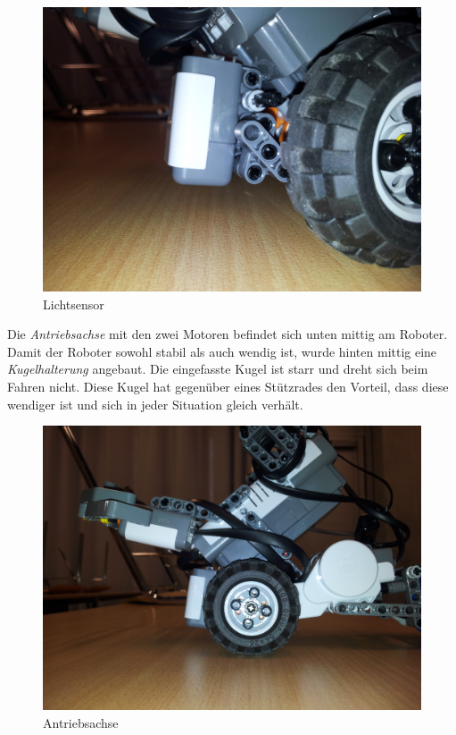 \documentclass[a4paper]{article}
\begin{document}
\begin{figure}[h]
  \centering
  \caption{Lichtsensor}
  \includegraphics[scale=0.06]{roboter_lichtsensor.jpg}
\end{figure}

Die \emph{Antriebsachse} mit den zwei Motoren befindet sich unten
mittig am Roboter. Damit der Roboter sowohl stabil als auch wendig
ist, wurde hinten mittig eine \emph{Kugelhalterung} angebaut. Die
eingefasste Kugel ist starr und dreht sich beim Fahren nicht. Diese
Kugel hat gegenüber eines Stützrades den Vorteil, dass diese wendiger
ist und sich in jeder Situation gleich verhält.

\begin{figure}[h]
  \centering
  \caption{Antriebsachse}
  \includegraphics[scale=0.06]{roboter_antriebsachse.jpg}
\end{figure}
\end{document}
